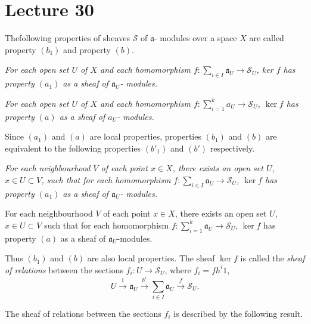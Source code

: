 \chapter{Lecture 30}\label{chap30:lec30}%

\begin{defi*}%
The\pageoriginale following properties of sheaves $\mathscr{S}$ of
$\mathfrak{a}$- modules over a space $X$ are called property
$(b_1)$ and property $(b)$.  
\end{defi*}

\medskip
{}
\textit{For each open set $U$ of $X$ and each homomorphism $f :
  \sum\limits_{i \in I} \mathfrak{a}_U \to \mathscr{S}_U$, ker $f$
  has property $(a_1)$ as a sheaf of $\mathfrak{a}_U$- modules.} 

\medskip
{}
\textit{For each open set $U$ of $X$ and each homomorphism $f :
  \sum^k_{i=1} a_U \to \mathscr{S}_U$, $\ker f$ has property $(a)$ as a
  sheaf of $a_U$- modules.}

\begin{note*}
Since $(a_1)$ and $(a)$ are local properties, properties
$(b_1)$ and $(b)$ are equivalent to the following properties $(b'_1)$
and $(b')$ respectively. 
\end{note*}

\medskip
{}
\textit{For each neighbourhood $V$ of each point $x \in X$, there
  exists an open set $U$, $x \in U \subset V$, such that for each
  homomorphism $f : \sum\limits_{i \in I} \mathfrak{a}_U \to \mathscr{S}_U$,
  $\ker f$ has property $(a_1)$ as a sheaf of $\mathfrak{a}_U$- modules. }  

\medskip
{}
For each neighbourhood $V$ of each point $x \in X$, there exists an
open set $U$, $x \in U \subset V$ such that for each homomorphism  $f
: \sum\limits^{k}_{i=1} \mathfrak{a}_U \to \mathscr{S}_U$, $\ker f$
has property $(a)$ as a sheaf of $\mathfrak{a}_U$-modules.  
 
Thus $(b_1)$ and $(b)$ are also local properties. The\pageoriginale
sheaf $\ker f$ is called the \textit{sheaf of relations} between the
sections $f_i : U \to \mathscr{S}_U$, where $f_i =f h^i 1$,  
$$
U  \xrightarrow{1} \mathfrak{a}_U  \xrightarrow {h^i} \sum_{i \in I}
\mathfrak{a}_U \xrightarrow{f} \mathscr{S}_U. 
$$

The sheaf of relations between the sections $f_i$ is described by the
following result. 

